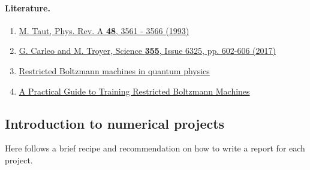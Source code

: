 \documentclass[%
oneside,                 %
final,                   %
10pt]{article}
\begin{document}
\paragraph{Literature.}
\begin{enumerate}
 \item \href{{https://journals.aps.org/pra/abstract/10.1103/PhysRevA.48.3561}}{M. Taut, Phys. Rev. A \textbf{48}, 3561 - 3566 (1993)}

 \item \href{{http://science.sciencemag.org/content/355/6325/602}}{G. Carleo and M. Troyer, Science \textbf{355}, Issue 6325, pp. 602-606 (2017)}

 \item \href{{https://www.nature.com/articles/s41567-019-0545-1}}{Restricted Boltzmann machines in quantum physics}

 \item \href{{https://www.cs.toronto.edu/~hinton/absps/guideTR.pdf}}{A Practical Guide to Training Restricted Boltzmann Machines}
\end{enumerate}

\noindent
\subsection*{Introduction to numerical projects}

Here follows a brief recipe and recommendation on how to write a report for each
project.
\end{document}

